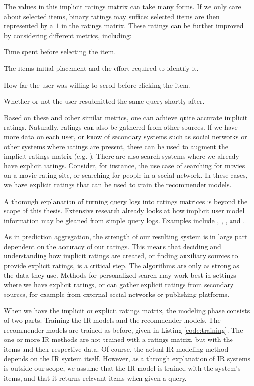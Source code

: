 The values in this implicit ratings matrix can take many forms.
If we only care about selected items, binary ratings may suffice:
selected items are then represented by a $1$ in the ratings matrix.
These ratings can be further improved by considering different metrics, including:

\begin{itemize*}
  \item Time spent before selecting the item.
  \item The items initial placement and the effort required to identify it.
  \item How far the user was willing to scroll before clicking the item.
  \item Whether or not the user resubmitted the same query shortly after.
\end{itemize*}

Based on these and other similar metrics, one can achieve quite accurate implicit ratings.
Naturally, ratings can also be gathered from other sources.
If we have more data on each user, or know of secondary systems such as social networks
or other systems where ratings are present, these can be used to augment the implicit ratings matrix
(e.g. \cite{Carmel2009}).
There are also search systems where we already have explicit ratings.
Consider, for instance, the use case of searching for movies on a movie rating site,
or searching for people in a social network.
In these cases, we have explicit ratings that can be used to train the recommender models.

A thorough explanation of turning query logs into ratings matrices
is beyond the scope of this thesis. Extensive research already
looks at how implicit user model information may be gleaned
from simple query logs. Examples include \cite{Joachims2007},
\cite{Lee2005}, \cite{Agichtein2006}, \cite{Mobasher} and
\cite{Speretta2000}.

As in prediction aggregation, the strength of our resulting system is in large part dependent on the accuracy of our ratings.
This means that deciding and understanding how implicit ratings are created, or 
finding auxiliary sources to provide explicit ratings, is a critical step.
The algorithms are only as strong as the data they use.
Methods for personalized search may work best in settings where we have explicit ratings,
or can gather explicit ratings from secondary sources, for example from external social networks or publishing platforms.

When we have the implicit or explicit ratings matrix, the modeling phase
consists of two parts. Training the IR models and the recommender models.
The recommender models are trained as before, given in Listing \ref{code:training}.
The one or more IR methods are not trained with a ratings matrix,
but with the items and their respective data.
Of course, the actual IR modeling method depends on the IR system itself.
However, as a through explanation of IR systems is outside our scope,
we assume that the IR model is trained with the system's items,
and that it returns relevant items when given a query.


